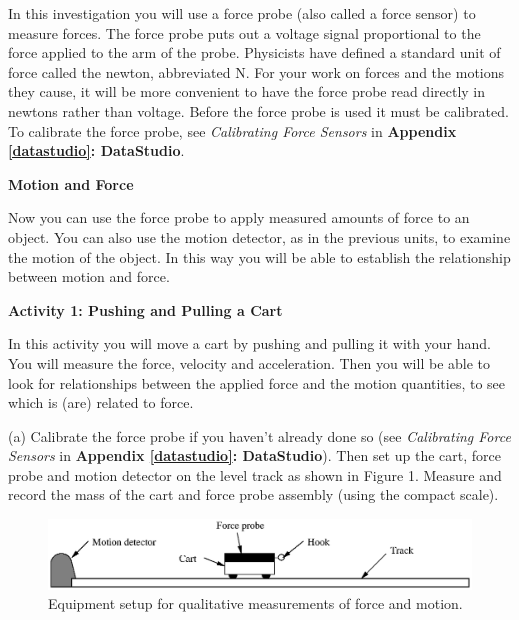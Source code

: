 In this investigation you will use a force probe (also called a force sensor) to measure forces. The force probe puts out a voltage signal proportional to the force applied to the arm of the probe. Physicists have defined a standard unit of force called the newton, abbreviated N. For your work on forces and the motions they cause, it will be more convenient to have the force probe read directly in newtons rather than voltage. Before the force probe is used it must be calibrated. To calibrate the force probe, see \textit{Calibrating Force Sensors} in \textbf{Appendix \ref{datastudio}: DataStudio}.

\pagebreak[2]
\textbf{Motion and Force} 

Now you can use the force probe to apply measured amounts of force to an object.
You can also use the motion detector, as in the previous units, to examine the
motion of the object. In this way you will be able to establish the relationship
between motion and force.
\vspace{10mm}

\textbf{Activity 1: Pushing and Pulling a Cart} 

In this activity you will move a cart by pushing and pulling it with your hand.
You will measure the force, velocity and acceleration. Then you will be able
to look for relationships between the applied force and the motion quantities,
to see which is (are) related to force.

(a) Calibrate the force probe if you haven't already done so (see \textit{Calibrating Force Sensors} in \textbf{Appendix \ref{datastudio}: DataStudio}). Then set up the cart, force probe and motion detector on the level track as shown in Figure 1. Measure and record the mass of the cart and force probe assembly (using the compact scale).

\answerspace{15mm}

\begin{figure}[t]
{\par\centering \includegraphics{force1/force1_fig1.eps} \par}


\caption{Equipment setup for qualitative measurements of force and motion.}
\end{figure}



